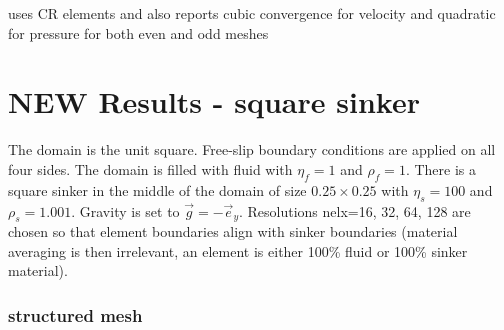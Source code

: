 \textcite{demh19} uses CR elements and also reports cubic convergence for velocity and quadratic for pressure
for both even and odd meshes


\newpage
\section*{NEW Results - square sinker}

The domain is the unit square. Free-slip boundary conditions are applied on all 
four sides. The domain is filled with fluid with $\eta_f=1$ and $\rho_f=1$.
There is a square sinker in the middle of the domain of size $0.25\times 0.25$ with $\eta_s=100$ and
$\rho_s=1.001$. Gravity is set to $\vec{g}=-\vec{e}_y$. 
Resolutions nelx=16, 32, 64, 128 are chosen so that element boundaries align with sinker boundaries 
(material averaging is then irrelevant, an element is either 100\% fluid or 100\% sinker material). 


\subsubsection*{structured mesh}


